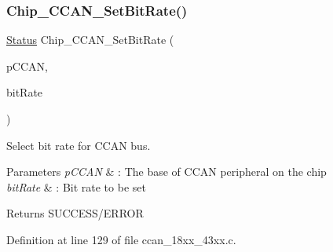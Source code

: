 \subsubsection{\texorpdfstring{Chip\+\_\+\+C\+C\+A\+N\+\_\+\+Set\+Bit\+Rate()}{Chip\_CCAN\_SetBitRate()}}
{\footnotesize\ttfamily \hyperlink{group___l_p_c___types___public___types_ga67a0db04d321a74b7e7fcfd3f1a3f70b}{Status} Chip\+\_\+\+C\+C\+A\+N\+\_\+\+Set\+Bit\+Rate (\begin{DoxyParamCaption}\item[{\hyperlink{struct_l_p_c___c_c_a_n___t}{L\+P\+C\+\_\+\+C\+C\+A\+N\+\_\+T} $\ast$}]{p\+C\+C\+AN,  }\item[{uint32\+\_\+t}]{bit\+Rate }\end{DoxyParamCaption})}



Select bit rate for C\+C\+AN bus. 


\begin{DoxyParams}{Parameters}
{\em p\+C\+C\+AN} & \+: The base of C\+C\+AN peripheral on the chip \\
\hline
{\em bit\+Rate} & \+: Bit rate to be set \\
\hline
\end{DoxyParams}
\begin{DoxyReturn}{Returns}
S\+U\+C\+C\+E\+S\+S/\+E\+R\+R\+OR 
\end{DoxyReturn}


Definition at line 129 of file ccan\+\_\+18xx\+\_\+43xx.\+c.

\mbox{\label{group___c_c_a_n__18_x_x__43_x_x_ga15f704e1c960d69aaaa2ea17c0247048}} 

